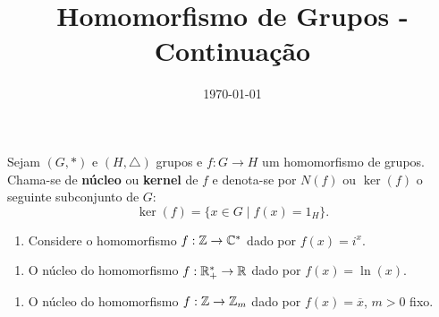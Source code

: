 \documentclass{beamer}
\title{Homomorfismo de Grupos - Continuação}
\author[\autor]{\autor}
\institute[\instituto]{\instituto}
\date{\today}
\begin{document}
    \begin{frame}
        \maketitle
    \end{frame}


    \begin{frame}
        \begin{definicao}
            Sejam $(G, *)$ e $(H, \triangle)$ grupos e $f : G \to H$ um homomorfismo de grupos. Chama-se de \textbf{n\'ucleo} ou \textbf{kernel} de $f$ e denota-se por $N(f)$ ou $\ker(f)$ o seguinte subconjunto de $G$:
            \[
                \ker(f) = \{x \in G \mid f(x) = 1_H\}.
            \]
        \end{definicao}
    \end{frame}

    \begin{frame}
        \begin{exemplos}
            \begin{enumerate}[label={\arabic*})]
                \item Considere o homomorfismo $f : \mathbb{Z} \to \mathbb{C}^*$ dado por $f(x) = i^x$.
                \seti
            \end{enumerate}
        \end{exemplos}
    \end{frame}
    \begin{frame}
        \begin{exemplos}
            \begin{enumerate}[label={\arabic*})]
            \conti
                \item O n\'ucleo do homomorfismo $f : \mathbb{R}^*_+ \to \mathbb{R}$ dado por $f(x) = \ln(x)$.
                \seti
            \end{enumerate}
        \end{exemplos}
    \end{frame}
    \begin{frame}
        \begin{exemplos}
            \begin{enumerate}[label={\arabic*})]
            \conti
                \item O n\'ucleo do homomorfismo $f : \mathbb{Z} \to \mathbb{Z}_m$ dado por $f(x) = \overline{x}$, $m > 0$ fixo.
            \end{enumerate}
        \end{exemplos}
    \end{frame}
\end{document}
